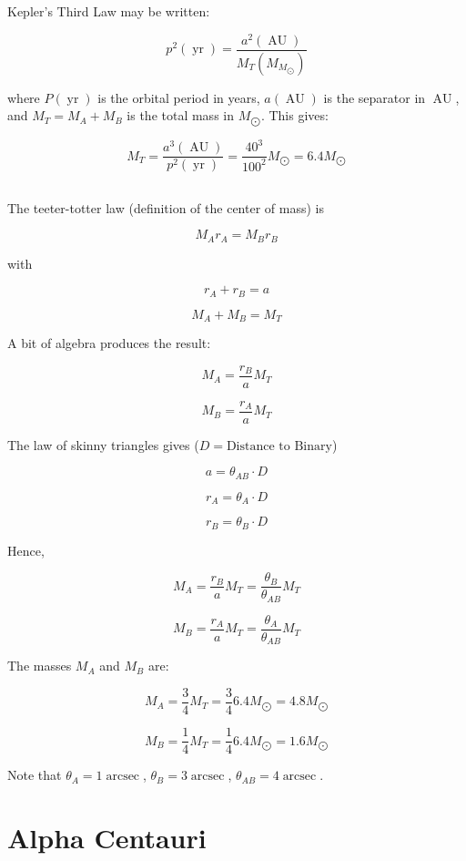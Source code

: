 \documentclass[11pt]{scrartcl}
\newcommand{\mearth}{M_{\bigodot}}
\DeclareMathOperator{\AU}{AU}
\DeclareMathOperator{\arcsec}{arcsec}
\DeclareMathOperator{\yr}{yr}
\begin{document}
Kepler's Third Law may be written:

\[p^2(\yr) = \frac{a^2(\AU)}{M_T(M_{\mearth})}\]

where $P(\yr)$ is the orbital period in years, $a(\AU)$ is the separator in $\AU$, and $M_T = M_A + M_B$ is the total mass in $\mearth$. This gives:

\[M_T = \frac{a^3(\AU)}{p^2(\yr)} = \frac{40^3}{100^2}\mearth = 6.4 \mearth\]

\subsection{}

The teeter-totter law (definition of the center of mass) is

\[M_A r_A = M_Br_B\]

with

\[r_A + r_B = a\]

\[M_A + M_B = M_T\]

A bit of algebra produces the result:

\[M_A = \frac{r_B}{a} M_T\]

\[M_B = \frac{r_A}{a} M_T\]

The law of skinny triangles gives ($D = \text{Distance to Binary}$)

\[a = \theta_{AB} \cdot D\]

\[r_A = \theta_{A} \cdot D\]

\[r_B = \theta_{B} \cdot D\]

Hence,

\[M_A = \frac{r_B}{a} M_T = \frac{\theta_B}{\theta_{AB}}M_T\]

\[M_B = \frac{r_A}{a}M_T = \frac{\theta_A}{\theta_{AB}}M_T\]

The masses $M_A$ and $M_B$ are:

\[M_A = \frac{3}{4} M_T = \frac{3}{4} 6.4 \mearth = 4.8 \mearth\]

\[M_B = \frac{1}{4} M_T = \frac{1}{4} 6.4 \mearth = 1.6\mearth\]

Note that $\theta_A = 1 \arcsec$, $\theta_B = 3 \arcsec$, $\theta_{AB} = 4 \arcsec$.

\section{Alpha Centauri}

\subsection{}
\end{document}
